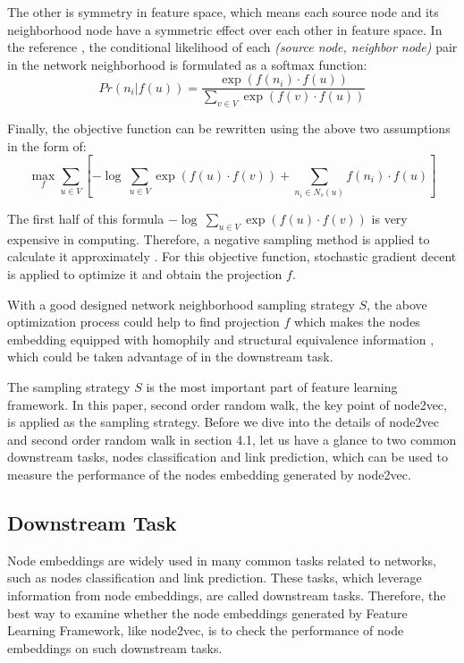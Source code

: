 \documentclass[sigconf]{acmart}
\begin{document}
The other is symmetry in feature space, which means each source node and its neighborhood node have a symmetric effect over each other in feature space. In the reference \cite{node2vec}, the conditional likelihood of each \textit{(source node, neighbor node)} pair in the network neighborhood is formulated as a softmax function:
$$Pr(n_i|f(u))=\frac{\exp(f(n_i)\cdot f(u))}{\sum_{v\in V} \exp(f(v)\cdot f(u))}$$

Finally, the objective function can be rewritten using the above two assumptions in the form of:
$$\mathop{max}\limits_{f} \sum_{u\in V}\left[-\log\ \sum_{u\in V}\exp(f(u)\cdot f(v))+ \sum_{n_i\in N_s(u)}f(n_i)\cdot f(u)\right]$$

The first half of this formula $-\log\ \sum_{u\in V}\exp(f(u)\cdot f(v))$ is very expensive in computing. Therefore, a negative sampling method is applied to calculate it approximately \cite{mikolov2013distributed}. For this objective function, stochastic gradient decent is applied to optimize it and obtain the projection $f$.

With a good designed network neighborhood sampling strategy $S$, the above optimization process could help to find projection $f$ which makes the nodes embedding equipped with homophily and structural equivalence information \cite{hoff2002latent}, which could be taken advantage of in the downstream task.

The sampling strategy $S$ is the most important part of feature learning framework. In this paper,  second order random walk, the key point of node2vec, is applied as the sampling strategy. Before we dive into the details of node2vec and second order random walk in section 4.1, let us have a glance to two common downstream tasks, nodes classification and link prediction, which can be used to measure the performance of the nodes embedding generated by node2vec. 

\subsection{Downstream Task}

Node embeddings are widely used in many common tasks related to networks, such as nodes classification and link prediction. These tasks, which leverage information from node embeddings, are called downstream tasks. Therefore, the best way to examine whether the node embeddings generated by Feature Learning Framework, like node2vec, is to check the performance of node embeddings on such downstream tasks.
\end{document}

